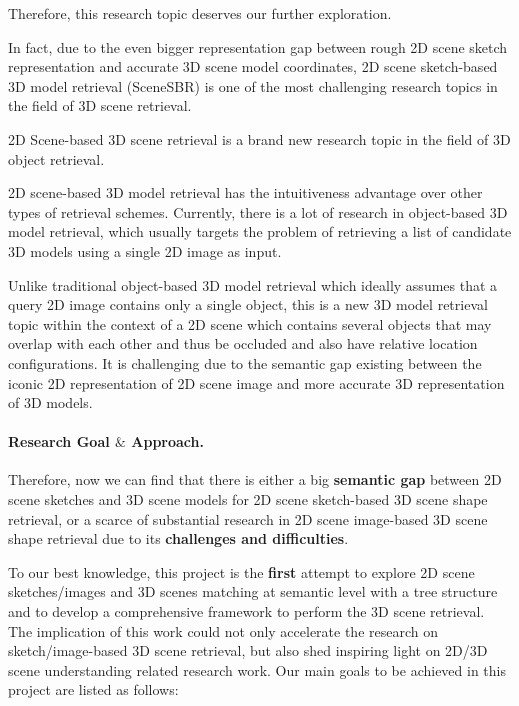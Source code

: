 Therefore, this research topic deserves our further exploration.



In fact, due to the even bigger representation gap between rough 2D scene sketch representation and accurate 3D scene model coordinates, 2D scene sketch-based 3D model retrieval (SceneSBR) is one of the most challenging research topics in the field of 3D scene retrieval. 

2D Scene-based 3D scene retrieval is a brand new research topic in the field of 3D
object retrieval. 

2D scene-based 3D model retrieval has the intuitiveness advantage over other types of retrieval schemes. Currently, there is a lot
of research in object-based 3D model retrieval, which usually targets the problem of retrieving a list of candidate 3D models
using a single 2D image as input. 



Unlike traditional object-based 3D model retrieval which ideally assumes that a query 2D image contains only a
single object, this is a new 3D model retrieval topic within the context of a 2D scene which contains several objects that
may overlap with each other and thus be occluded and also have relative location configurations. It is challenging due to the
semantic gap existing between the iconic 2D representation of 2D scene image and more accurate 3D representation of 3D models.



\paragraph{Research Goal $\&$ Approach.}
Therefore, now we can find that there is either a big \textbf{semantic gap} between 2D scene sketches and 3D scene models for 2D scene sketch-based 3D scene shape retrieval, or a scarce of substantial research in 2D scene image-based 3D scene shape retrieval due to its \textbf{challenges and difficulties}. 

To our best knowledge, this project is the \textbf{first} attempt to explore 2D scene sketches/images and 3D scenes matching at semantic level with a tree structure and to develop a comprehensive framework to perform the 3D scene retrieval. The implication of this work could not only accelerate the research on sketch/image-based 3D scene retrieval, but also shed inspiring light on 2D/3D scene understanding related research work. Our main goals to be achieved in this project are listed as follows:

